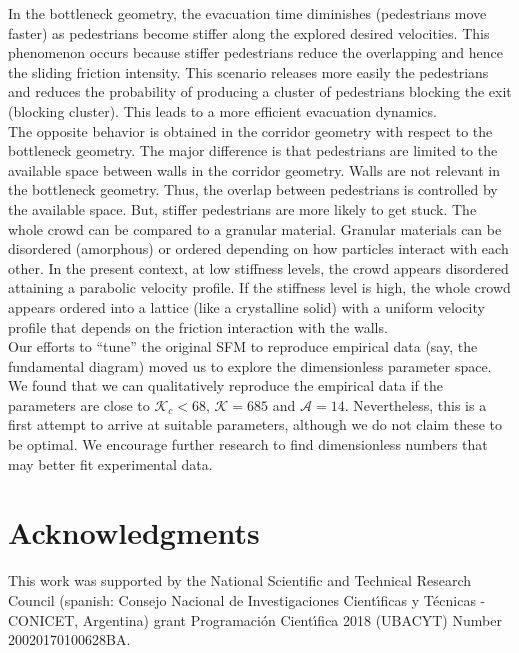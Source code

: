 \documentclass[preprint,12pt]{elsarticle}
\begin{document}
In the bottleneck geometry, the evacuation time diminishes (pedestrians move
faster) as pedestrians become stiffer along the explored desired velocities.
This phenomenon occurs because stiffer pedestrians reduce the overlapping and
hence the sliding friction intensity. This scenario releases more easily the
pedestrians and reduces the probability of producing a cluster of pedestrians
blocking the exit (blocking cluster). This leads to a more efficient evacuation
dynamics. \\

The opposite behavior is obtained in the corridor geometry with respect to the
bottleneck geometry. The major difference is that pedestrians are limited to the
available space between walls in the corridor geometry.  Walls are not relevant
in the bottleneck geometry. Thus, the overlap between pedestrians is controlled
by the available space. But, stiffer pedestrians are more likely to get stuck.
The whole crowd can be compared to a granular material. Granular materials can
be disordered (amorphous) or ordered depending on how particles interact with
each other. In the present context, at low stiffness levels, the crowd appears
disordered attaining a parabolic velocity profile. If the stiffness level is
high, the whole crowd appears ordered into a lattice (like a crystalline solid)
with a uniform velocity profile that depends on the friction interaction with
the walls.\\

Our efforts to ``tune'' the original SFM to reproduce empirical data (say, the 
fundamental diagram) moved us to explore the dimensionless parameter space.  We 
found that  we can qualitatively reproduce the empirical data if the parameters 
are close to $\mathcal{K}_c < 68$, $\mathcal{K} = 685$ and $\mathcal{A}=14$. 
Nevertheless, this is a first attempt to arrive at suitable parameters, although
 we do not claim these to be optimal. We encourage further research to find 
 dimensionless numbers that may better fit experimental data.\\


\section*{Acknowledgments}
This work was supported by the National Scientific and Technical 
Research Council (spanish: Consejo Nacional de Investigaciones Cient\'\i ficas 
y T\'ecnicas - CONICET, Argentina) grant Programaci\'on Cient\'\i fica 2018 
(UBACYT) Number 20020170100628BA.\\
\end{document}

